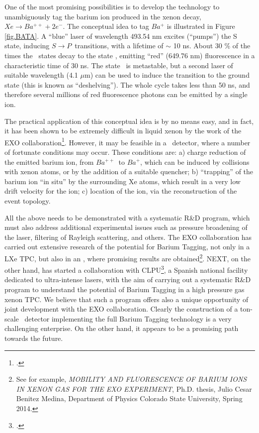 One of the most promising possibilities is to develop the technology to unambiguously tag the barium ion produced in the xenon decay, $Xe \rightarrow Ba^{++} + 2 e^-$. The conceptual idea to tag $Ba^{+}$ is illustrated in Figure \ref{fig.BATA}. A ``blue'' laser of wavelength 493.54 nm excites (``pumps'') the S state, inducing $S \rightarrow P$~transitions, with a lifetime of $\sim$ 10 ns. About 30 \% of the times the \TwoP\ states decay to the state \TwoD, emitting ``red'' (649.76 nm) fluorescence in a characteristic time of 30 ns. The state \TwoD\ is metastable, but a second laser of suitable wavelength (4.1 $\mu$m) can be used to induce the transition to the ground state (this is known as ``deshelving'').  The whole cycle takes less than 50 ns, and therefore several millions of red fluorescence photons can be emitted by a single ion. 

The practical application of this conceptual idea is by no means easy, and in fact, it has been shown to be extremely difficult in liquid xenon by the work of the EXO collaboration\footcite{Dolinski:2012dta}. However, it may be feasible in a \HPXE\ detector, where a number of fortunate conditions may occur. These conditions are: a) charge reduction of the emitted barium ion, from $Ba^{++}$~to $Ba^{+}$, which can be induced by collisions with xenon atoms, or by the addition of a suitable quencher; b) ``trapping'' of the barium ion ``in situ'' by the surrounding Xe atoms, which result in a very low drift velocity for the ion; c) location of the ion, via the reconstruction of the event topology. 

All the above needs to be demonstrated with a systematic R\&D program, which must also address additional experimental issues such as pressure broadening of the laser, filtering of Rayleigh scattering, and others. The EXO collaboration has carried out extensive research of the potential for Barium Tagging, not only in a LXe TPC, but also in an \HPXE, where promising results are obtained\footnote{See for example, {\em MOBILITY AND FLUORESCENCE OF BARIUM IONS IN XENON GAS FOR THE EXO EXPERIMENT},
Ph.D. thesis, Julio Cesar Benitez Medina, Department of Physics
Colorado State University,
Spring 2014.}. NEXT, on the other hand, has started a collaboration with CLPU\footcite{clpu}, a Spanish national facility dedicated to ultra-intense lasers, with the aim of carrying out a systematic R\&D program to understand the potential of Barium Tagging in a high pressure gas xenon TPC. We believe that such a program offers also a unique opportunity of joint development with the EXO collaboration. Clearly the construction of a ton-scale \HPXE\ detector implementing the full Barium Tagging technology is a very challenging enterprise. On the other hand, it appears to be a promising path towards the future. 


